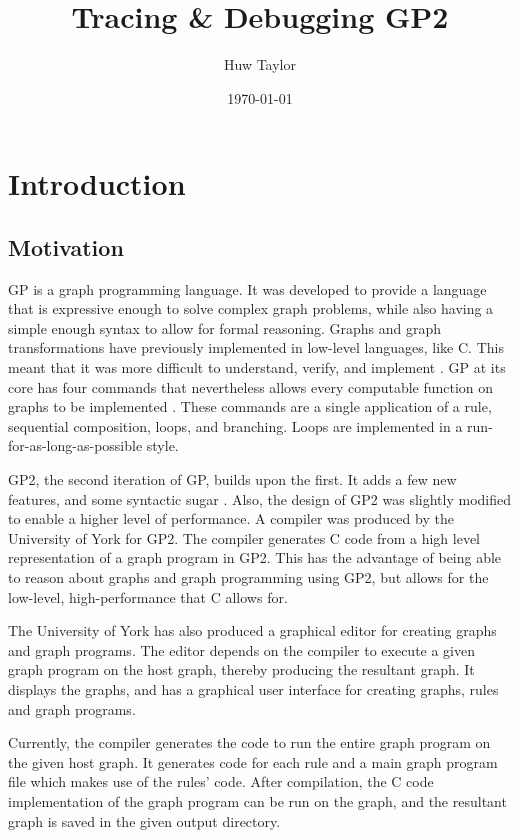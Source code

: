 \documentclass{UoYCSproject}
\author{Huw Taylor}
\title{Tracing \& Debugging GP2}
\date{\today}
\begin{document}
\maketitle
\tableofcontents

\chapter{Introduction}
\section{Motivation}
GP is a graph programming language. It was developed to provide a language that is expressive enough to solve complex graph problems, while also having a simple enough syntax to allow for formal reasoning. Graphs and graph transformations have previously implemented in low-level languages, like C. This meant that it was more difficult to understand, verify, and implement \cite{gp_lang}. GP at its core has four commands that nevertheless allows every computable function on graphs to be implemented \cite{gp1}. These commands are a single application of a rule, sequential composition, loops, and branching. Loops are implemented in a run-for-as-long-as-possible style.

GP2, the second iteration of GP, builds upon the first. It adds a few new features, and some syntactic sugar \cite{gp2_design}. Also, the design of GP2 was slightly modified to enable a higher level of performance. A compiler was produced by the University of York for GP2. The compiler generates C code from a high level representation of a graph program in GP2. This has the advantage of being able to reason about graphs and graph programming using GP2, but allows for the low-level, high-performance that C allows for.

The University of York has also produced a graphical editor for creating graphs and graph programs. The editor depends on the compiler to execute a given graph program on the host graph, thereby producing the resultant graph. It displays the graphs, and has a graphical user interface for creating graphs, rules and graph programs.

Currently, the compiler generates the code to run the entire graph program on the given host graph. It generates code for each rule and a main graph program file which makes use of the rules' code. After compilation, the C code implementation of the graph program can be run on the graph, and the resultant graph is saved in the given output directory.
\end{document}
